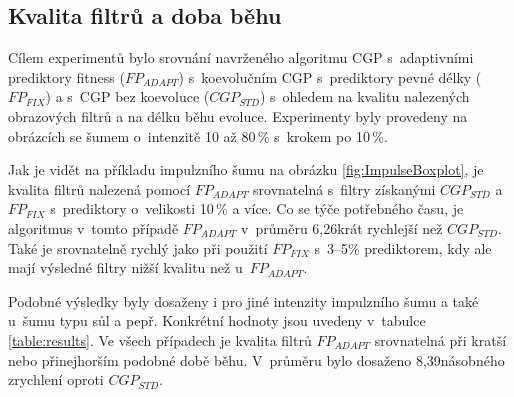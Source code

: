 \documentclass[fleqn,11pt]{ExcelAtFIT} %
\begin{document}
\subsection{Kvalita filtrů a doba běhu}

Cílem experimentů bylo srovnání navrženého algoritmu CGP s~adaptivními prediktory fitness ($\mathit{FP_{ADAPT}}$) s~koevolučním CGP s~prediktory pevné délky ($\mathit{FP_{FIX}}$) a s~CGP bez koevoluce ($\mathit{CGP_{STD}}$) s~ohledem na kvalitu nalezených obrazových filtrů a na délku běhu evoluce. Experimenty byly provedeny na obrázcích se šumem o~intenzitě 10 až 80\,\% s~krokem po 10\,\%.

Jak je vidět na příkladu impulzního šumu na obrázku \ref{fig:ImpulseBoxplot}, je kvalita filtrů nalezená pomocí $\mathit{FP_{ADAPT}}$ srovnatelná s~filtry získanými $\mathit{CGP_{STD}}$ a $\mathit{FP_{FIX}}$ s~prediktory o~velikosti 10\,\% a více. Co se týče potřebného času, je algoritmus v~tomto případě $\mathit{FP_{ADAPT}}$ v~průměru 6,26krát rychlejší než $\mathit{CGP_{STD}}$. Také je srovnatelně rychlý jako při použití $\mathit{FP_{FIX}}$ s~3--5\% prediktorem, kdy ale mají výsledné filtry nižší kvalitu než u~$\mathit{FP_{ADAPT}}$.

Podobné výsledky byly dosaženy i pro jiné intenzity impulzního šumu a také u~šumu typu sůl a pepř. Konkrétní hodnoty jsou uvedeny v~tabulce \ref{table:results}. Ve všech případech je kvalita filtrů $\mathit{FP_{ADAPT}}$ srovnatelná při kratší nebo přinejhorším podobné době běhu. V~průměru bylo dosaženo 8,39násobného zrychlení oproti $\mathit{CGP_{STD}}$.
\end{document}
